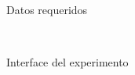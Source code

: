 \begin{figure}[ht]
\begin{center}
\\[0pt]
\caption{Datos requeridos}
\label{fig-nacionalidadGenero}
\end{center}
\end{figure}

\begin{figure}[ht]
\begin{center}
\\[0pt]
\caption{Interface del experimento}
\label{fig-interface}
\end{center}
\end{figure}

